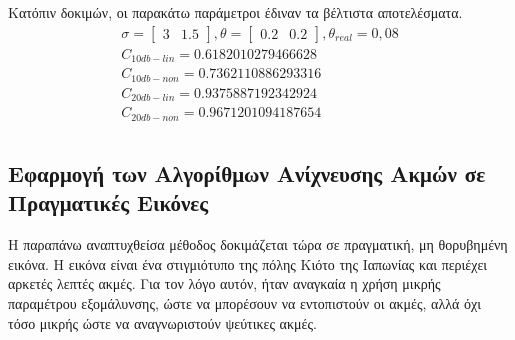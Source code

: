\documentclass{article}
\begin{document}
Κατόπιν δοκιμών, οι παρακάτω παράμετροι έδιναν τα βέλτιστα αποτελέσματα.
\begin{equation}
    \begin{gathered}
        \sigma = \begin{bmatrix}3 & 1.5 \end{bmatrix},
        \theta = \begin{bmatrix}0.2 & 0.2 \end{bmatrix},
        \theta_{real} = 0,08\\
        C_{10db-lin} = 0.6182010279466628\\
        C_{10db-non} = 0.7362110886293316\\
        C_{20db-lin} = 0.9375887192342924\\
        C_{20db-non} = 0.9671201094187654\\
    \end{gathered}
\end{equation}

\subsection{Εφαρμογή των Αλγορίθμων Ανίχνευσης Ακμών σε Πραγματικές Εικόνες}

Η παραπάνω αναπτυχθείσα μέθοδος δοκιμάζεται τώρα σε πραγματική, μη θορυβημένη εικόνα. Η εικόνα είναι ένα στιγμιότυπο της πόλης Κιότο της Ιαπωνίας και περιέχει αρκετές λεπτές ακμές. Για τον λόγο αυτόν, ήταν αναγκαία η χρήση μικρής παραμέτρου εξομάλυνσης, ώστε να μπορέσουν να εντοπιστούν οι ακμές, αλλά όχι τόσο μικρής ώστε να αναγνωριστούν ψεύτικες ακμές.
\end{document}
